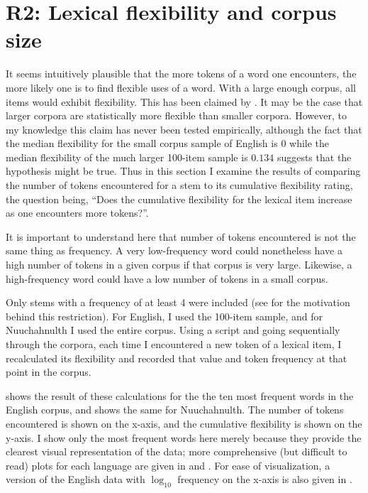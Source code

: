 \section{R2: Lexical flexibility and corpus size}
\label{sec:4.4}

It seems intuitively plausible that the more tokens of a word one encounters, the more likely one is to find flexible uses of a word. With a large enough corpus, all items would exhibit flexibility. This has been claimed by \textcite[77]{MoselHovdhaugen1992}. It may be the case that larger corpora are statistically more flexible than smaller corpora. However, to my knowledge this claim has never been tested empirically, although the fact that the median flexibility for the small corpus sample of English is $0$ while the median flexibility of the much larger 100-item sample is $0.134$ suggests that the hypothesis might be true. Thus in this section I examine the results of comparing the number of tokens encountered for a stem to its cumulative flexibility rating, the question being, \enquote{Does the cumulative flexibility for the lexical item increase as one encounters more tokens?}.

It is important to understand here that number of tokens encountered is not the same thing as frequency. A very low-frequency word could nonetheless have a high number of tokens in a given corpus if that corpus is very large. Likewise, a high-frequency word could have a low number of tokens in a small corpus.

Only stems with a frequency of at least 4 were included (see  for the motivation behind this restriction). For English, I used the 100-item sample, and for Nuuchahnulth I used the entire corpus. Using a script and going sequentially through the corpora, each time I encountered a new token of a lexical item, I recalculated its flexibility and recorded that value and token frequency at that point in the corpus.

 shows the result of these calculations for the the ten most frequent words in the English corpus, and  shows the same for Nuuchahnulth. The number of tokens encountered is shown on the x-axis, and the cumulative flexibility is shown on the y-axis. I show only the most frequent words here merely because they provide the clearest visual representation of the data; more comprehensive (but difficult to read) plots for each language are given in  and . For ease of visualization, a version of the English data with $\log_{10}$ frequency on the x-axis is also given in .

